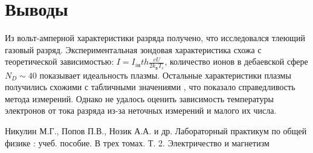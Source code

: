 \documentclass[a4paper,12pt]{article} %
\begin{document}
\section{Выводы}
Из вольт-амперной характеристики разряда получено, что исследовался тлеющий газовый разряд. 
Экспериментальная зондовая характеристика схожа с теоретической зависимостью: $I = I_{iн} th\frac{eU}{2k_БT_e}$, количество ионов в дебаевской сфере $N_D \sim 40$ показывает идеальность плазмы. Остальные характеристики плазмы получились схожими с табличными значениями \cite{labnik}, что показало справедливость метода измерений. Однако не удалось оценить зависимость температуры электронов от тока разряда из-за неточных измерений и малого их числа.


\begin{thebibliography}{}
      Никулин М.Г., Попов П.В., Нозик А.А. и др. Лабораторный практикум по общей физике : учеб. пособие. В трех томах. Т. 2. Электричество и магнетизм
\end{thebibliography}
\end{document}
